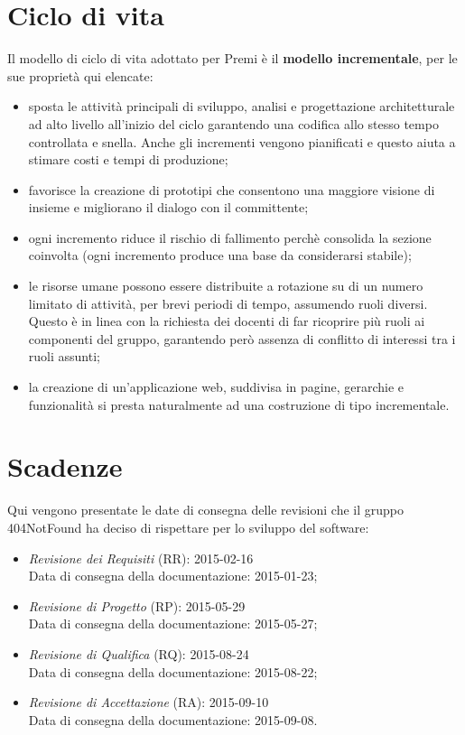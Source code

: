 \newpage
\section{Ciclo di vita}
Il modello di ciclo di vita adottato per Premi è il \textbf{modello incrementale}, per le sue proprietà qui elencate:

\begin{itemize}
	\item sposta le attività principali di sviluppo, analisi e progettazione architetturale ad alto livello all'inizio del ciclo garantendo una codifica allo stesso tempo controllata e snella. Anche gli incrementi vengono pianificati e questo aiuta a stimare costi e tempi di produzione;
	\item favorisce la creazione di prototipi che consentono una maggiore visione di insieme e migliorano il dialogo con il committente;
	\item ogni incremento riduce il rischio di fallimento perchè consolida la sezione coinvolta (ogni incremento produce una base da considerarsi stabile);
	\item le risorse umane possono essere distribuite a rotazione su di un numero limitato di attività, per brevi periodi di tempo, assumendo ruoli diversi. Questo è in linea con la richiesta dei docenti di far ricoprire più ruoli ai componenti del gruppo, garantendo però assenza di conflitto di interessi tra i ruoli assunti;
	\item la creazione di un'applicazione web, suddivisa in pagine, gerarchie e funzionalità si presta naturalmente ad una costruzione di tipo incrementale.
\end{itemize}	

\section{Scadenze}
Qui vengono presentate le date di consegna delle revisioni che il gruppo 404NotFound ha deciso di rispettare per lo sviluppo del software:

\begin{itemize}
	\item \textit{Revisione dei Requisiti} (RR): 2015-02-16 \\
	Data di consegna della documentazione: 2015-01-23;
	\item \textit{Revisione di Progetto} (RP): 2015-05-29 \\
	Data di consegna della documentazione: 2015-05-27;
	\item \textit{Revisione di Qualifica} (RQ): 2015-08-24 \\
	Data di consegna della documentazione: 2015-08-22;
	\item \textit{Revisione di Accettazione} (RA): 2015-09-10 \\
	Data di consegna della documentazione: 2015-09-08.
\end{itemize}
